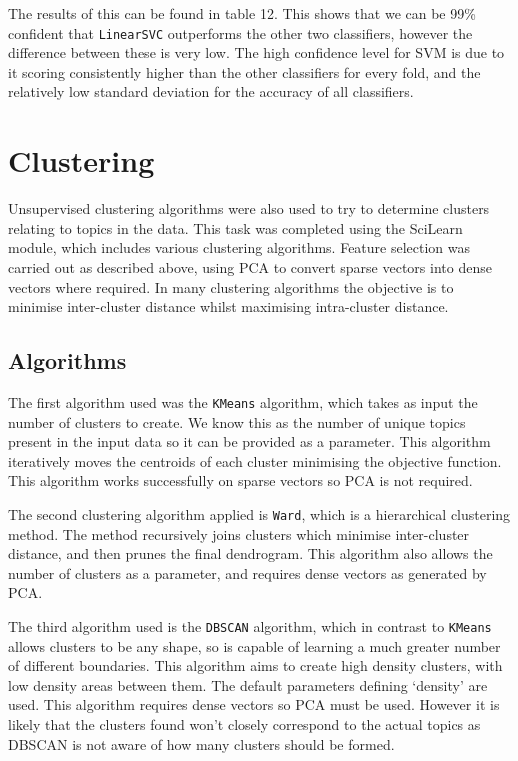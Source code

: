 \documentclass{article}
\begin{document}
The results of this can be found in table 12. This shows that we can be 99\% confident that \verb|LinearSVC| outperforms the other two classifiers, however the difference between these is very low. The high confidence level for SVM is due to it scoring consistently higher than the other classifiers for every fold, and the relatively low standard deviation for the accuracy of all classifiers.

\section{Clustering}
Unsupervised clustering algorithms were also used to try to determine clusters relating to topics in the data. This task was completed using the SciLearn module, which includes various clustering algorithms. Feature selection was carried out as described above, using PCA to convert sparse vectors into dense vectors where required. In many clustering algorithms the objective is to minimise inter-cluster distance whilst maximising intra-cluster distance.

\subsection{Algorithms}
The first algorithm used was the \verb|KMeans| algorithm, which takes as input the number of clusters to create. We know this as the number of unique topics present in the input data so it can be provided as a parameter. This algorithm iteratively moves the centroids of each cluster minimising the objective function. This algorithm works successfully on sparse vectors so PCA is not required.

The second clustering algorithm applied is \verb|Ward|, which is a hierarchical clustering method. The method recursively joins clusters which minimise inter-cluster distance, and then prunes the final dendrogram. This algorithm also allows the number of clusters as a parameter, and requires dense vectors as generated by PCA.

The third algorithm used is the \verb|DBSCAN| algorithm, which in contrast to \verb|KMeans| allows clusters to be any shape, so is capable of learning a much greater number of different boundaries. This algorithm aims to create high density clusters, with low density areas between them. The default parameters defining `density' are used. This algorithm requires dense vectors so PCA must be used. However it is likely that the clusters found won't closely correspond to the actual topics as DBSCAN is not aware of how many clusters should be formed.
\end{document}

